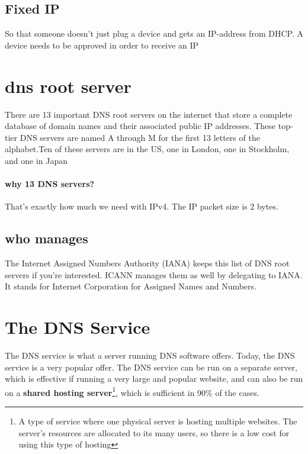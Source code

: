 \documentclass[a4paper,12pt]{book}
\begin{document}

%
%


\subsection{Fixed IP}
So that someone doesn't just plug a device and gets an IP-address from DHCP. A device needs to be approved in order to receive an IP

\section{dns root server}
There are 13 important DNS root servers on the internet that store a complete database of domain names and their associated public IP addresses. These top-tier DNS servers are named A through M for the first 13 letters of the alphabet.Ten of these servers are in the US, one in London, one in Stockholm, and one in Japan 

\paragraph{why 13 DNS servers?}
\begin{flushleft}
That's exactly how much we need with IPv4. The IP packet size is 2 bytes.
\end{flushleft}

\subsection{who manages}
The Internet Assigned Numbers Authority (IANA) keeps this list of DNS root servers if you're interested. ICANN manages them as well by delegating to IANA. It stands for Internet Corporation for Assigned Names and Numbers.

\section{The DNS Service}
The DNS service is what a server running DNS software offers. Today, the DNS service is a very popular offer. The DNS service can be run on a separate server, which is effective if running a very large and popular website, and can also be run on a \textbf{shared hosting server}\footnote{\label{sharedHostingServer}A type of service where one physical server is hosting multiple websites. The server’s resources are allocated to its many users, so there is a low cost for using this type of hosting}, which is sufficient in 90\% of the cases.
\end{document}
